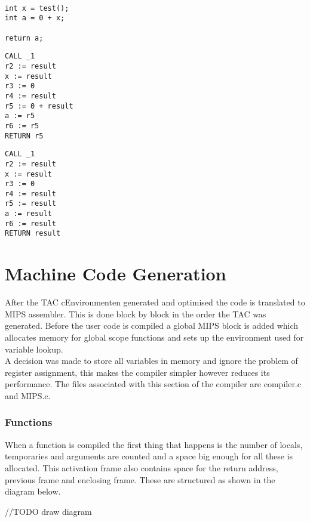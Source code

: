 \documentclass{article}
\begin{document}
\begin{minipage}{0.3\textwidth}
\begin{lstlisting}

int x = test();
int a = 0 + x;

return a;
\end{lstlisting}
\end{minipage}%
\begin{minipage}{0.3\textwidth}
\begin{lstlisting}
CALL _1
r2 := result
x := result
r3 := 0
r4 := result
r5 := 0 + result
a := r5
r6 := r5
RETURN r5
\end{lstlisting}
\end{minipage}%
\begin{minipage}{0.3\textwidth}
\begin{lstlisting}
CALL _1
r2 := result
x := result
r3 := 0
r4 := result
r5 := result
a := result
r6 := result
RETURN result
\end{lstlisting}
\end{minipage}%

\section{Machine Code Generation}

After the TAC cEnvironmenten generated and optimised the code is translated to MIPS
assembler. This is done block by block in the order the TAC was generated.
Before the user code is compiled a global MIPS block is added which allocates memory
for global scope functions and sets up the environment used for variable lookup.\\
A decision was made to store all variables in memory and ignore the problem of register
assignment, this makes the compiler simpler however reduces its performance. The files
associated with this section of the compiler are compiler.c and MIPS.c.

\subsubsection{Functions}
When a function is compiled the first thing that happens is the number of locals,
temporaries and arguments are counted and a space big enough for all these is allocated.
This activation frame also contains space for the return address, previous frame
and enclosing frame. These are structured as shown in the diagram below.

//TODO draw diagram
\end{document}
